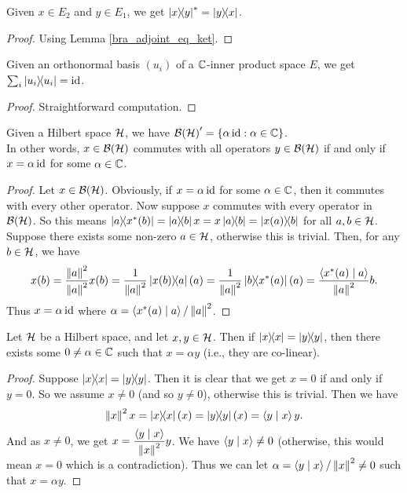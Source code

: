  \begin{lemma}\label{rankOne_adjoint}\leanok
  Given $x\in E_2$ and $y\in E_1$, we get $\left\lvert x\right\rangle\!\!\left\langle y\right\rvert^*=\left\lvert y\right\rangle\!\!\left\langle x\right\rvert$.
 \end{lemma}
 \begin{proof}\leanok
  Using Lemma \ref{bra_adjoint_eq_ket}.
 \end{proof}

 \begin{lemma}\label{sum_rankOne_onb_eq_id}\leanok
  Given an orthonormal basis $(u_i)$ of a $\mathbb{C}$-inner product space $E$, we get $\sum_i\left\lvert u_i\right\rangle\!\!\left\langle u_i\right\rvert=\operatorname{id}$.
 \end{lemma}
 \begin{proof}\leanok
  Straightforward computation.
 \end{proof}

 \begin{lemma}\label{ContinuousLinearMap.centralizer}\leanok
  Given a Hilbert space $\mathcal{H}$, we have ${\mathcal{B}(\mathcal{H})}^\prime=\{\alpha\operatorname{id}:\alpha\in\mathbb{C}\}$.\\
  In other words, $x\in\mathcal{B}(\mathcal{H})$ commutes with all operators $y\in\mathcal{B}(\mathcal{H})$ if and only if $x=\alpha\operatorname{id}$ for some $\alpha\in\mathbb{C}$.
 \end{lemma}
 \begin{proof}\leanok
  Let $x\in\mathcal{B}(\mathcal{H})$. Obviously, if $x=\alpha\operatorname{id}$ for some $\alpha\in\mathbb{C}$, then it commutes with every other operator. Now suppose $x$ commutes with every operator in $\mathcal{B}(\mathcal{H})$.
  So this means $\ketbra{a}{x^*(b)}=\ketbra{a}{b}x=x\ketbra{a}{b}=\ketbra{x(a)}{b}$ for all $a,b\in\mathcal{H}$.
  Suppose there exists some non-zero $a\in\mathcal{H}$, otherwise this is trivial. Then, for any $b\in\mathcal{H}$, we have
  \[x(b)=\frac{\left\|a\right\|^2}{\left\|a\right\|^2}x(b)=\frac{1}{\left\|a\right\|^2}\left\lvert x(b)\right\rangle\!\!\left\langle a\right\rvert(a)=\frac{1}{\left\|a\right\|^2}\left\lvert b\right\rangle\!\!\left\langle x^*(a)\right\rvert(a)=\frac{\left\langle x^*(a) \mid a\right\rangle}{\left\|a\right\|^2}b.\]
  Thus $x=\alpha\operatorname{id}$ where $\alpha=\left\langle x^*(a) \mid a\right\rangle/\left\|a\right\|^2$.
 \end{proof}

 \begin{proposition}\label{colinear_of_rankOne_self_eq_rankOne_self}\leanok
  Let $\mathcal{H}$ be a Hilbert space, and let $x,y\in\mathcal{H}$. Then if $\left\lvert x\right\rangle\!\!\left\langle x\right\rvert=\left\lvert y\right\rangle\!\!\left\langle y\right\rvert$, then there exists some $0\neq\alpha\in\mathbb{C}$ such that $x=\alpha{y}$ (i.e., they are co-linear).
 \end{proposition}
 \begin{proof}\leanok
  Suppose $\left\lvert x\right\rangle\!\!\left\langle x\right\rvert=\left\lvert y\right\rangle\!\!\left\langle y\right\rvert$. Then it is clear that we get $x=0$ if and only if $y=0$. So we assume $x\neq0$ (and so $y\neq0$), otherwise this is trivial.
  Then we have \[\left\|x\right\|^2x=\left\lvert x\right\rangle\!\!\left\langle x\right\rvert(x)=\left\lvert y\right\rangle\!\!\left\langle y\right\rvert(x)=\left\langle y \mid x\right\rangle y.\]
  And as $x\neq0$, we get $x=\dfrac{\left\langle y \mid x\right\rangle}{\left\|x\right\|^2}y$. We have $\left\langle y \mid x\right\rangle\neq0$ (otherwise, this would mean $x=0$ which is a contradiction). Thus we can let $\alpha=\left\langle y \mid x\right\rangle/\left\|x\right\|^2\neq0$ such that $x=\alpha{y}$.
 \end{proof}


